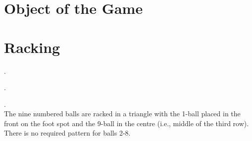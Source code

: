 



\section{Object of the Game} \label{9ball:description}

\section{Racking} \label{9ball:racking}
\ex. \RackingUp[9ball]\par
\ex. \DetermineWhoRacks\par
\ex. \TableDiagram[9ball]\\
The nine numbered balls are racked in a triangle with the 1-ball placed in the front on the foot spot and the 9-ball in the centre (i.e., middle of the third row). There is no required pattern for balls 2-8.\itemspace
{}\TightlyPacked\itemspace
{}\RackPlacement[9ball]\itemspace
{}\RackingTool[9ball]\itemspace
{}\RackInspection[9ball]



